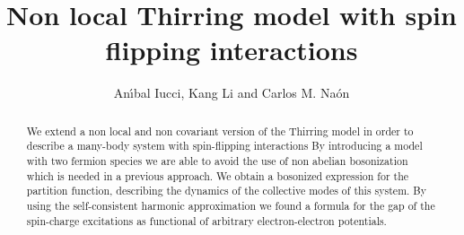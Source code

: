 \documentclass[a4paper,a4paper]{article}
\begin{document}
\providecommand{\unmedio}{{\scriptstyle\frac{1}{2}}}
\providecommand{\eff}{_{\text{eff}}}
\providecommand{\Infinity}{\infty}
\providecommand{\flip}{_{\text{flip}}}
\providecommand{\bos}{_{0\text{B}}}
\providecommand{\bosonic}{_{\text{bos}}}
\providecommand{\ferm}{_{0\text{F}}}
\providecommand{\trial}{_{\text{trial}}}
\providecommand{\true}{_{\text{true}}}

\providecommand{\sign}{\operatorname{sign}}
\providecommand{\Ci}{\operatorname{Ci}}
\providecommand{\tr}{\operatorname{tr}}

\providecommand{\PsiB}{\bar{\Psi}}   %
\providecommand{\phiH}{\hat{\phi}}
\providecommand{\etaH}{\hat{\eta}}
\providecommand{\chiB}{\bar{\chi}}
\providecommand{\xiH}{\hat{\xi}}
\providecommand{\zetaH}{\hat{\zeta}}
\providecommand{\vH}{\hat{v}}
\providecommand{\bH}{\hat{b}}

\providecommand{\AB}{\bar{A}_\mu}
\providecommand{\BB}{\bar{B}_\mu}
\providecommand{\AT}{\tilde{A}_\mu}
\providecommand{\BT}{\tilde{B}_\mu}

\providecommand{\slp}{\raise.15ex\hbox{\myHighlight{$/$}\coordHE{}}\kern-.57em\hbox{\myHighlight{$\partial$}\coordHE{}}}
\providecommand{\slA}{\raise.15ex\hbox{\myHighlight{$/$}\coordHE{}}\kern-.63em\hbox{\myHighlight{$A$}\coordHE{}}}

\providecommand{\difp}{\frac{d^2p}{(2\pi)^2}\,}

\providecommand{\bra}{\left\langle}
\providecommand{\ket}{\right\rangle}
\providecommand{\bracket}{\left\langle\,\right\rangle}

\providecommand{\D}{\mathcal{D}}
\providecommand{\N}{\mathcal{N}}
\providecommand{\Lag}{\mathcal{L}}
\providecommand{\V}{\mathcal{V}}
\providecommand{\Z}{\mathcal{Z}}


\thispagestyle{empty}
\title{Non local Thirring model with spin flipping interactions}
\author{An\'{\i}bal Iucci\coordHE{},  Kang Li\coordHE{} and Carlos M. Na\'on\coordHE{}}
\date{}
\maketitle

\begin{abstract}

We extend a non local and non covariant version of the Thirring model in order to
describe a many-body system with spin-flipping interactions By introducing a model
with two fermion species we are able to avoid the use of non abelian bosonization
which is needed in a previous approach. We obtain a bosonized expression for the
partition function, describing the dynamics of the collective modes of this system. By
using the self-consistent harmonic approximation we found a formula for the gap of the
spin-charge excitations as functional of arbitrary electron-electron potentials.

\end{abstract}
\end{document}
